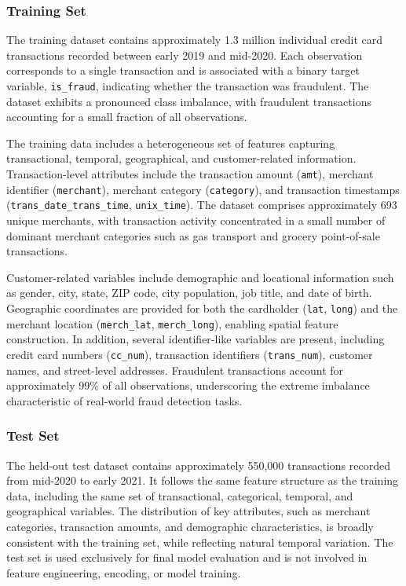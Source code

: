 \documentclass[oneside,12pt,parskip=half,american,numbers=noenddot]{scrreprt}
\begin{document}
\subsubsection{Training Set}
The training dataset contains approximately 1.3 million individual credit card transactions recorded between early 2019 and mid-2020. Each observation corresponds to a single transaction and is associated with a binary target variable, \texttt{is\_fraud}, indicating whether the transaction was fraudulent. The dataset exhibits a pronounced class imbalance, with fraudulent transactions accounting for a small fraction of all observations.

The training data includes a heterogeneous set of features capturing transactional, temporal, geographical, and customer-related information. Transaction-level attributes include the transaction amount (\texttt{amt}), merchant identifier (\texttt{merchant}), merchant category (\texttt{category}), and transaction timestamps (\texttt{trans\_date\_trans\_time}, \texttt{unix\_time}). The dataset comprises approximately 693 unique merchants, with transaction activity concentrated in a small number of dominant merchant categories such as gas transport and grocery point-of-sale transactions.

Customer-related variables include demographic and locational information such as gender, city, state, ZIP code, city population, job title, and date of birth. Geographic coordinates are provided for both the cardholder (\texttt{lat}, \texttt{long}) and the merchant location (\texttt{merch\_lat}, \texttt{merch\_long}), enabling spatial feature construction. In addition, several identifier-like variables are present, including credit card numbers (\texttt{cc\_num}), transaction identifiers (\texttt{trans\_num}), customer names, and street-level addresses. Fraudulent transactions account for approximately 99\% of all observations, underscoring the extreme imbalance characteristic of real-world fraud detection tasks.


\subsubsection{Test Set}
The held-out test dataset contains approximately 550,000 transactions recorded from mid-2020 to early 2021. It follows the same feature structure as the training data, including the same set of transactional, categorical, temporal, and geographical variables. The distribution of key attributes, such as merchant categories, transaction amounts, and demographic characteristics, is broadly consistent with the training set, while reflecting natural temporal variation. The test set is used exclusively for final model evaluation and is not involved in feature engineering, encoding, or model training.
\end{document}
